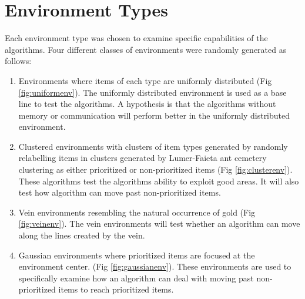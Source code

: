 \section{Environment Types}
\label{thri:third:environmenttypes}
Each environment type was chosen to examine specific capabilities of the algorithms. Four different classes of environments were randomly generated as follows:
\begin{enumerate}
\item Environments where items of each type are uniformly distributed (Fig \ref{fig:uniformenv}). The uniformly distributed environment is used as a base line to test the algorithms. A hypothesis is that the algorithms without memory or communication will perform better in the uniformly distributed environment. 
\item Clustered environments with clusters of item types generated by randomly relabelling items in clusters generated by Lumer-Faieta ant cemetery clustering \cite{lumer1994diversity} as either prioritized or non-prioritized items (Fig \ref{fig:clusterenv}). These algorithms test the algorithms ability to exploit good areas. It will also test how algorithm can move past non-prioritized items. 
\item Vein environments resembling the natural occurrence of gold \cite{frimmel2002recent} (Fig \ref{fig:veinenv}). The vein environments will test whether an algorithm can move along the lines created by the vein. 
\item Gaussian environments where prioritized items are focused at the environment center. (Fig \ref{fig:gaussianenv}). These environments are used to specifically examine how an algorithm can deal with moving past non-prioritized items to reach prioritized items. 
\end{enumerate} 

